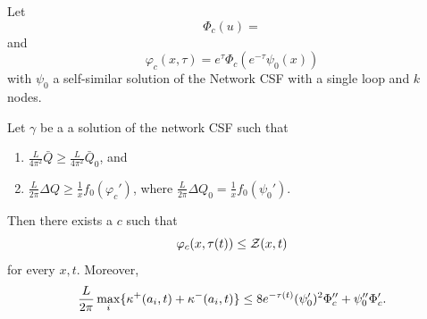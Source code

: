 \documentclass[11pt]{amsart}
\begin{document}
\begin{theorem}
\label{thm:comparison_function}
Let
\[
\Phi_c(u) = 
\]
and
\[
\varphi_c(x, \tau) = e^{\tau} \Phi_c(e^{-\tau} \psi_0(x))
\]
with $\psi_0$ a self-similar solution of the Network CSF with a single loop and $k$ nodes.

Let $\gamma$ be a a solution of the network CSF such that
\begin{enumerate}
\item $\frac{L}{4\pi^2} \bar{Q} \geq \frac{L}{4\pi^2} \bar{Q}_0$, and
\item $\frac{L}{2\pi} \Delta Q \geq \tfrac{1}{x} f_0(\varphi_c')$, where $\frac{L}{2\pi} \Delta Q_0 = \tfrac{1}{x} f_0(\psi_0')$.
\end{enumerate}
Then there exists a $c$ such that
\[
\varphi_c(x, \tau(t)) \leq \operatorname{\mathcal{Z}}(x, t)
\]
for every $x, t$. Moreover,
\[
\frac{L}{2\pi} \max_i \{\operatorname{\kappa}^+(a_i, t) + \operatorname{\kappa}^-(a_i, t)\} \leq 8 e^{-\tau(t)} (\psi_0')^2 \Phi_c'' + \psi_0'' \Phi_c'.
\]
\end{theorem}
\end{document}
